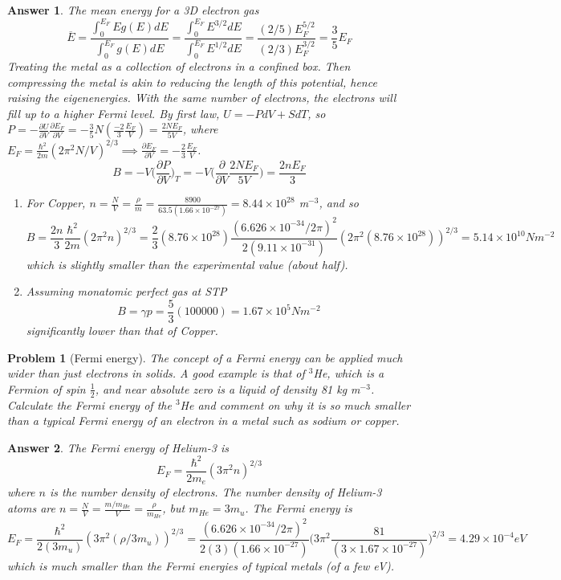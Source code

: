 \documentclass[a4paper]{article}
\newtheorem{ans}{Answer}[section]
\theoremstyle{new}
\newtheorem{qns}{Problem}[section]
\begin{document}
\begin{ans}
The mean energy for a 3D electron gas
$$\overline{E}=\frac{\int_0^{E_F}Eg(E)dE}{\int_0^{E_F}g(E)dE}=\frac{\int_0^{E_F}E^{3/2}dE}{\int_0^{E_F}E^{1/2}dE}=\frac{(2/5)E_F^{5/2}}{(2/3)E_F^{3/2}}=\frac{3}{5}E_F$$
Treating the metal as a collection of electrons in a confined box. Then compressing the metal is akin to reducing the length of this potential, hence raising the eigenenergies. With the same number of electrons, the electrons will fill up to a higher Fermi level. By first law, $U=-PdV+SdT$, so $P=-\frac{\partial U}{\partial V}\frac{\partial E_F}{\partial V}=-\frac{3}{5}N(\frac{-2}{3}\frac{E_F}{V})=\frac{2NE_F}{5V}$, where $E_F=\frac{\hbar^2}{2m}(2\pi^2N/V)^{2/3}\implies\frac{\partial E_F}{\partial V}=-\frac{2}{3}\frac{E_F}{V}$. 
$$B=-V\bigg(\frac{\partial P}{\partial V}\bigg)_T=-V\bigg(\frac{\partial}{\partial V}\frac{2NE_F}{5V}\bigg)=\frac{2nE_F}{3}$$
\begin{enumerate}[label=(\alph*)]
\item For Copper, $n=\frac{N}{V}=\frac{\rho}{m}=\frac{8900}{63.5(1.66\times10^{-27})}=8.44\times10^{28}$ m$^{-3}$, and so 
$$B=\frac{2n}{3}\frac{\hbar^2}{2m}(2\pi^2n)^{2/3}=\frac{2}{3}(8.76\times10^{28})\frac{(6.626\times10^{-34}/2\pi)^2}{2(9.11\times10^{-31})}(2\pi^2(8.76\times10^{28}))^{2/3}=5.14\times10^{10}Nm^{-2}$$
which is slightly smaller than the experimental value (about half).
\item Assuming monatomic perfect gas at STP
$$B=\gamma p=\frac{5}{3}(100000)=1.67\times10^5Nm^{-2}$$
significantly lower than that of Copper.
\end{enumerate}
\end{ans}
\begin{qns}[Fermi energy]
The concept of a Fermi energy can be applied much wider than just electrons in solids. A good example is that of $^3$He, which is a Fermion of spin $\frac{1}{2}$, and near absolute zero is a liquid of density 81 kg m$^{-3}$. Calculate the Fermi energy of the $^3$He and comment on why it is so much smaller than a typical Fermi energy of an electron in a metal such as sodium or copper.
\end{qns}
\begin{ans}
The Fermi energy of Helium-3 is
$$E_F=\frac{\hbar^2}{2m_e}(3\pi^2n)^{2/3}$$
where $n$ is the number density of electrons. The number density of Helium-3 atoms are $n=\frac{N}{V}=\frac{m/m_{He}}{V}=\frac{\rho}{m_{He}}$, but $m_{He}=3m_u$. The Fermi energy is
$$E_F=\frac{\hbar^2}{2(3m_u)}(3\pi^2(\rho/3m_u))^{2/3}=\frac{(6.626\times10^{-34}/2\pi)^2}{2(3)(1.66\times10^{-27})}\bigg(3\pi^2\frac{81}{(3\times1.67\times10^{-27})}\bigg)^{2/3}=4.29\times10^{-4}eV$$
which is much smaller than the Fermi energies of typical metals (of a few eV).
\end{ans}
\end{document}
